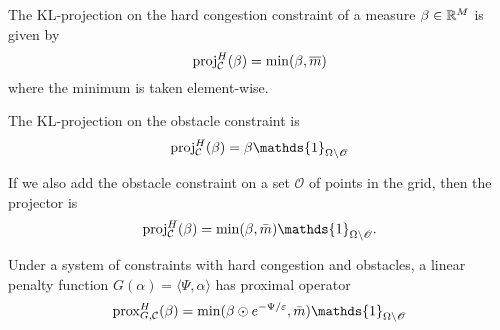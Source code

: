 \documentclass[../report.tex]{subfiles}
\begin{document}
\begin{prop}\label{prop:KLproxExamples}
	The KL-projection on the hard congestion constraint of a measure $\beta\in\mathbb{R}^M$ is given by
	\begin{equation}
	\operatorname{proj}^{H}_{\mathcal{C}}(\beta) = \min(\beta,\overline{m})
	\end{equation}
	where the minimum is taken element-wise.
	
	The KL-projection on the obstacle constraint is
	\begin{equation}
	\proj^{H}_\calC (\beta) = \beta \mathds{1}_{\Omega\backslash\mathscr{O}}
	\end{equation}
	
	If we also add the obstacle constraint on a set $\mathscr{O}$ of points in the grid, then the projector is
	\begin{equation}
	\proj^{H}_\calC(\beta) = \min(\beta, \bar{m})\mathds{1}_{\Omega\backslash\mathscr{O}}.
	\end{equation}
	
	Under a system of constraints with hard congestion and obstacles, a linear penalty function $G(\alpha) = \langle\Psi, \alpha\rangle$ has proximal operator
	\begin{equation}
	\prox^{H}_{G,\calC}(\beta) =
	\min(\beta\odot e^{-\Psi/\epsilon},\bar{m}) \mathds{1}_{\Omega\backslash\mathscr{O}}
	\end{equation}
\end{prop}
\end{document}
